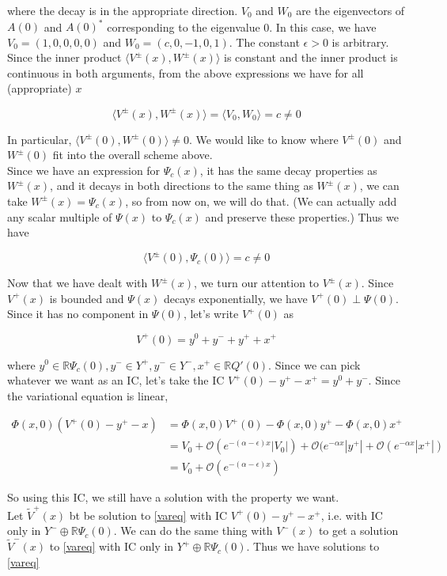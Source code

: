 \documentclass[12pt]{article}
\def\R{{\mathbb R}}
\begin{document}
where the decay is in the appropriate direction. $V_0$ and $W_0$ are the eigenvectors of $A(0)$ and $A(0)^*$ corresponding to the eigenvalue 0. In this case, we have $V_0 = (1, 0, 0, 0, 0)$ and $W_0 = (c, 0, -1, 0, 1)$. The constant $\epsilon > 0$ is arbitrary. Since the inner product $\langle V^\pm(x), W^\pm(x) \rangle$ is constant and the inner product is continuous in both arguments, from the above expressions we have for all (appropriate) $x$

\[
\langle V^\pm(x), W^\pm(x) \rangle = \langle V_0, W_0 \rangle = c \neq 0
\]

In particular, $\langle V^\pm(0), W^\pm(0) \rangle \neq 0$. We would like to know where $V^\pm(0)$ and $W^\pm(0)$ fit into the overall scheme above. \\

Since we have an expression for $\Psi_c(x)$, it has the same decay properties as $W^\pm(x)$, and it decays in both directions to the same thing as $W^\pm(x)$, we can take $W^\pm(x) = \Psi_c(x)$, so from now on, we will do that. (We can actually add any scalar multiple of $\Psi(x)$ to $\Psi_c(x)$ and preserve these properties.) Thus we have

\[
\langle V^\pm(0), \Psi_c(0) \rangle = c \neq 0
\]

Now that we have dealt with $W^\pm(x)$, we turn our attention to $V^\pm(x)$. Since $V^+(x)$ is bounded and $\Psi(x)$ decays exponentially, we have $V^+(0) \perp \Psi(0)$. Since it has no component in $\Psi(0)$, let's write $V^+(0)$ as

\[
V^+(0) = y^0 + y^- + y^+ + x^+
\]

where $y^0 \in \R \Psi_c(0), y^- \in Y^+, y^- \in Y^-, x^+ \in \R Q'(0)$. Since we can pick whatever we want as an IC, let's take the IC $V^+(0) - y^+ - x^+ = y^0 + y^-$. Since the variational equation is linear,

\begin{align*}
\Phi(x, 0)( V^+(0) - y^+ - x ) &= \Phi(x, 0)V^+(0) - \Phi(x, 0) y^+ - \Phi(x, 0) x^+ \\
&= V_0 + \mathcal{O}(e^{-(\alpha - \epsilon)x}|V_0|) + \mathcal{O}(e^{-\alpha x}|y^+| + 
\mathcal{O}(e^{-\alpha x}|x^+|) \\
&= V_0 + \mathcal{O}(e^{-(\alpha - \epsilon)x})
\end{align*}

So using this IC, we still have a solution with the property we want.\\

Let $\tilde{V}^+(x)$ bt be solution to \eqref{vareq} with IC $V^+(0) - y^+ - x^+$, i.e. with IC only in $Y^- \oplus \R \Psi_c(0)$. We can do the same thing with $V^-(x)$ to get a solution $\tilde{V}^-(x)$ to \eqref{vareq} with IC only in $Y^+ \oplus \R \Psi_c(0)$. Thus we have solutions to \eqref{vareq}
\end{document}
